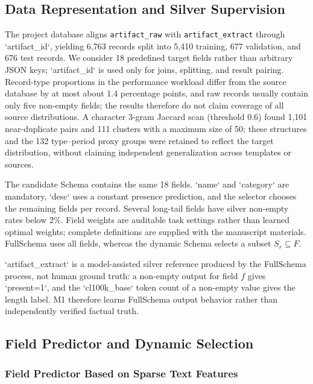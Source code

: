 \documentclass[runningheads]{llncs}
\newcommand{\method}{M1}
\newcommand{\full}{FullSchema}
\begin{document}
\subsection{Data Representation and Silver Supervision}

The project database aligns \texttt{artifact\allowbreak\_raw} with \texttt{artifact\allowbreak\_extract} through `artifact_id`, yielding 6,763 records split into 5,410 training, 677 validation, and 676 test records. We consider 18 predefined target fields rather than arbitrary JSON keys; `artifact_id` is used only for joins, splitting, and result pairing. Record-type proportions in the performance workload differ from the source database by at most about 1.4 percentage points, and raw records usually contain only five non-empty fields; the results therefore do not claim coverage of all source distributions. A character 3-gram Jaccard scan (threshold 0.6) found 1,101 near-duplicate pairs and 111 clusters with a maximum size of 50; these structures and the 132 type--period proxy groups were retained to reflect the target distribution, without claiming independent generalization across templates or sources.

The candidate Schema contains the same 18 fields. `name` and `category` are mandatory, `desc` uses a constant presence prediction, and the selector chooses the remaining fields per record. Several long-tail fields have silver non-empty rates below 2\%. Field weights are auditable task settings rather than learned optimal weights; complete definitions are supplied with the manuscript materials. \full{} uses all fields, whereas the dynamic Schema selects a subset $S_r\subseteq F$.

`artifact_extract` is a model-assisted silver reference produced by the \full{} process, not human ground truth: a non-empty output for field $f$ gives `present=1`, and the `cl100k_base` token count of a non-empty value gives the length label. \method{} therefore learns \full{} output behavior rather than independently verified factual truth.

\subsection{Field Predictor and Dynamic Selection}
\subsubsection{Field Predictor Based on Sparse Text Features}
\end{document}
